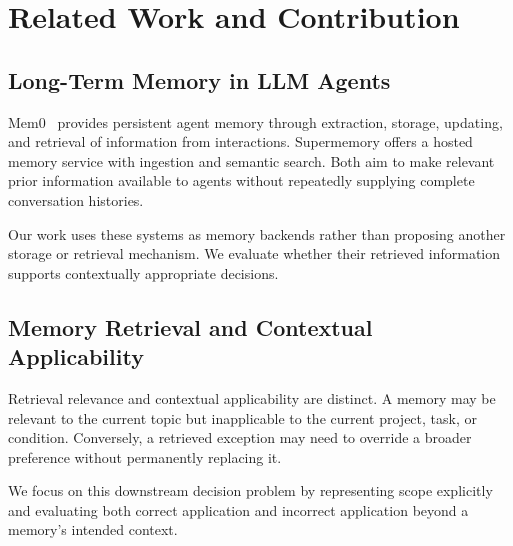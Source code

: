 \section{Related Work and Contribution}
\label{sec:related}

\subsection{Long-Term Memory in LLM Agents}

Mem0~\cite{chhikara2025mem0} provides persistent agent memory
through extraction, storage, updating, and retrieval of
information from interactions. Supermemory
\cite{supermemoryresearch} offers a hosted memory service with
ingestion and semantic search. Both aim to make relevant prior
information available to agents without repeatedly supplying
complete conversation histories.

Our work uses these systems as memory backends rather than
proposing another storage or retrieval mechanism. We evaluate
whether their retrieved information supports contextually
appropriate decisions.

\subsection{Memory Retrieval and Contextual Applicability}

Retrieval relevance and contextual applicability are distinct.
A memory may be relevant to the current topic but inapplicable
to the current project, task, or condition. Conversely, a
retrieved exception may need to override a broader preference
without permanently replacing it.

We focus on this downstream decision problem by representing
scope explicitly and evaluating both correct application and
incorrect application beyond a memory's intended context.
